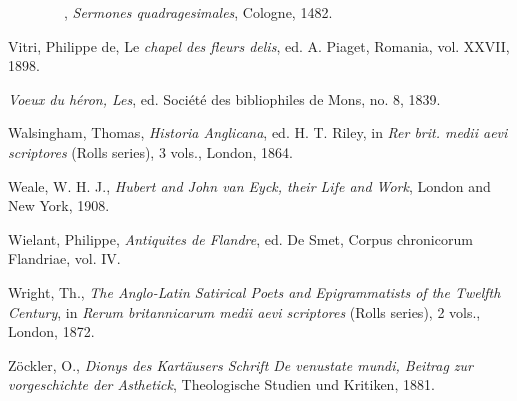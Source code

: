 {~~~~~~~~}, \emph{Sermones quadragesimales}, Cologne, 1482.

Vitri, Philippe de, Le \emph{chapel des fleurs delis}, ed. A. Piaget,
Romania, vol. XXVII, 1898.

\emph{Voeux du héron, Les}, ed. Société des bibliophiles de Mons, no. 8,
1839.

Walsingham, Thomas, \emph{Historia Anglicana}, ed. H. T. Riley, in
\emph{Rer brit. medii aevi scriptores} (Rolls series), 3 vols., London,
1864.

Weale, W. H. J., \emph{Hubert and John van Eyck, their Life and Work},
London and New York, 1908.

Wielant, Philippe, \emph{Antiquites de Flandre}, ed. De Smet, Corpus
chronicorum Flandriae, vol. IV.

Wright, Th., \emph{The Anglo-Latin Satirical Poets and Epigrammatists of
the Twelfth Century}, in \emph{Rerum britannicarum medii aevi
scriptores} (Rolls series), 2 vols., London, 1872.

Zöckler, O., \emph{Dionys des Kartäusers Schrift De venustate mundi,
Beitrag zur vorgeschichte der Asthetick}, Theologische Studien und
Kritiken, 1881.

% 
